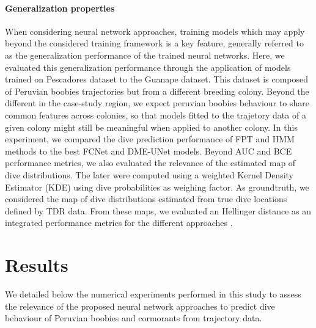 \documentclass{article}
\begin{document}
\paragraph{Generalization properties}
When considering neural network approaches, training models which may apply beyond the considered training framework is a key feature, generally referred to as the generalization performance of the trained neural networks. Here, we evaluated this generalization performance through the application of models trained on Pescadores dataset to the Guanape dataset.
This dataset is composed of Peruvian boobies trajectories but from a different breeding colony. Beyond the different in the case-study region, we expect peruvian boobies behaviour to share common features across colonies, so that models fitted to the trajetory data of a given colony might still be meaningful when applied to another colony.
In this experiment, we compared the dive prediction performance of FPT and HMM methods to the best FCNet and DME-UNet models. Beyond AUC and BCE performance metrics, we also evaluated the relevance of the estimated map of dive distributions. The later were computed using a weighted Kernel Density Estimator (KDE) using dive probabilities as weighing factor. As groundtruth, we considered the map of dive distributions estimated from true dive locations defined by TDR data. From these maps, we evaluated an Hellinger distance as an integrated performance metrics for the different approaches \citep{wilson_distancebased_2011}.

\section{Results}

We detailed below the numerical experiments performed in this study to assess the relevance of the proposed neural network approaches to predict dive behaviour of Peruvian boobies and cormorants from trajectory data.
\end{document}
